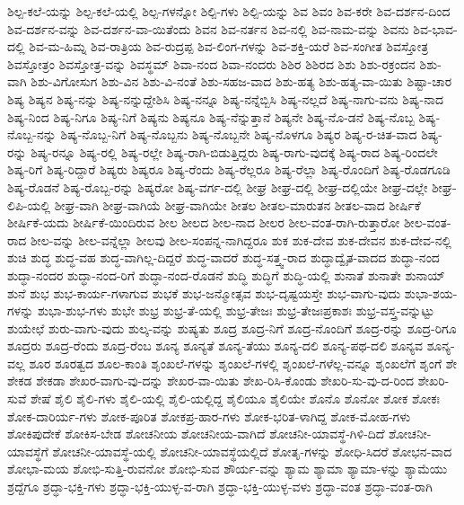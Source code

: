 {ಶಿಲ್ಪ-ಕಲೆ-ಯನ್ನು
ಶಿಲ್ಪ-ಕಲೆ-ಯಲ್ಲಿ
ಶಿಲ್ಪ-ಗಳನ್ನೋ
ಶಿಲ್ಪಿ-ಗಳು
ಶಿಲ್ಪಿ-ಯನ್ನು
ಶಿವ
ಶಿವಂ
ಶಿವ-ಕರೇ
ಶಿವ-ದರ್ಶನ-ದಿಂದ
ಶಿವ-ದರ್ಶನ-ವನ್ನು
ಶಿವ-ದರ್ಶನ-ವಾ-ಯಿತೆಂದು
ಶಿವನ
ಶಿವ-ನರ್ತನ
ಶಿವ-ನಲ್ಲಿ
ಶಿವ-ನಾಮ-ವನ್ನು
ಶಿವನು
ಶಿವ-ಭಾವ-ದಲ್ಲಿ
ಶಿವ-ಮ-ಹಿಮ್ನ
ಶಿವ-ರಾತ್ರಿಯ
ಶಿವ-ರುದ್ರಪ್ಪ
ಶಿವ-ಲಿಂಗ-ಗಳನ್ನು
ಶಿವ-ಶಕ್ತಿ-ಯರೆ
ಶಿವ-ಸಂಗೀತ
ಶಿವಸ್ತೋತ್ರ
ಶಿವಸ್ತೋತ್ರಂ
ಶಿವಸ್ತೋತ್ರ-ವನ್ನು
ಶಿವಸ್ಥಮ್
ಶಿವಾ-ನಂದ
ಶಿವಾ-ನಂದರು
ಶಿಶಿರ
ಶಿಶಿರದ
ಶಿಶು
ಶಿಶು-ರಕ್ರಂದನ
ಶಿಶು-ವಾಗಿ
ಶಿಶು-ವಿಗೋಸುಗ
ಶಿಶು-ವಿನ
ಶಿಶು-ವಿ-ನಂತೆ
ಶಿಶು-ಸಹಜ-ವಾದ
ಶಿಶು-ಹತ್ಯ
ಶಿಶು-ಹತ್ಯ-ವಾ-ಯಿತು
ಶಿಷ್ಟಾ-ಚಾರ
ಶಿಷ್ಯ
ಶಿಷ್ಯನ
ಶಿಷ್ಯ-ನನ್ನು
ಶಿಷ್ಯ-ನನ್ನುದ್ದೇಶಿಸಿ
ಶಿಷ್ಯ-ನನ್ನೂ
ಶಿಷ್ಯ-ನನ್ನೆಬ್ಬಿಸಿ
ಶಿಷ್ಯ-ನಲ್ಲದೆ
ಶಿಷ್ಯ-ನಾಗು-ವನು
ಶಿಷ್ಯ-ನಾದ
ಶಿಷ್ಯ-ನಿಂದ
ಶಿಷ್ಯ-ನಿಗೂ
ಶಿಷ್ಯ-ನಿಗೆ
ಶಿಷ್ಯನು
ಶಿಷ್ಯನೂ
ಶಿಷ್ಯ-ನೆನ್ನುತ್ತಾನೆ
ಶಿಷ್ಯನೇ
ಶಿಷ್ಯ-ನೊ-ಡನೆ
ಶಿಷ್ಯ-ನೊಬ್ಬ
ಶಿಷ್ಯ-ನೊಬ್ಬ-ನನ್ನು
ಶಿಷ್ಯ-ನೊಬ್ಬ-ನಿಗೆ
ಶಿಷ್ಯ-ನೊಬ್ಬನು
ಶಿಷ್ಯ-ನೊಬ್ಬನೇ
ಶಿಷ್ಯ-ನೊಳಗೂ
ಶಿಷ್ಯರ
ಶಿಷ್ಯ-ರ-ಚಿತ-ವಾದ
ಶಿಷ್ಯ-ರನ್ನು
ಶಿಷ್ಯ-ರನ್ನೂ
ಶಿಷ್ಯ-ರಲ್ಲಿ
ಶಿಷ್ಯ-ರಲ್ಲೇ
ಶಿಷ್ಯ-ರಾಗಿ-ಬಿಡುತ್ತಿದ್ದರು
ಶಿಷ್ಯ-ರಾಗು-ವುದಕ್ಕೆ
ಶಿಷ್ಯ-ರಾದ
ಶಿಷ್ಯ-ರಿಂದಲೇ
ಶಿಷ್ಯ-ರಿಗೆ
ಶಿಷ್ಯ-ರಿದ್ದಾರೆ
ಶಿಷ್ಯರು
ಶಿಷ್ಯರೂ
ಶಿಷ್ಯ-ರೆಂದು
ಶಿಷ್ಯ-ರೆಲ್ಲರೂ
ಶಿಷ್ಯ-ರೆಲ್ಲಾ
ಶಿಷ್ಯ-ರೊಂದಿಗೆ
ಶಿಷ್ಯ-ರೊಡಗೂಡಿ
ಶಿಷ್ಯ-ರೊಡನೆ
ಶಿಷ್ಯ-ರೊಬ್ಬ-ರನ್ನು
ಶಿಷ್ಯರೋ
ಶಿಷ್ಯ-ವರ್ಗ-ದಲ್ಲಿ
ಶೀಘ್ರ
ಶೀಘ್ರ-ದಲ್ಲಿ
ಶೀಘ್ರ-ದಲ್ಲಿಯೇ
ಶೀಘ್ರ-ದಲ್ಲೇ
ಶೀಘ್ರ-ಲಿಪಿ-ಯಲ್ಲಿ
ಶೀಘ್ರ-ವಾಗಿ
ಶೀಘ್ರ-ವಾಗಿಯೆ
ಶೀಘ್ರ-ವಾಗಿಯೇ
ಶೀತಲ
ಶೀತಲ-ಮಾರುತನ
ಶೀತಲ-ವಾದ
ಶೀರ್ಷಿಕೆ
ಶೀರ್ಷಿಕೆ-ಯದು
ಶೀರ್ಷಿಕೆ-ಯಿಂದಿರುವ
ಶೀಲ
ಶೀಲದ
ಶೀಲ-ನಾದ
ಶೀಲರ
ಶೀಲ-ವಂತ-ರಾಗಿ-ರುತ್ತಾರೋ
ಶೀಲ-ವಂತ-ರಾದ
ಶೀಲ-ವನ್ನು
ಶೀಲ-ವನ್ನೆಲ್ಲಾ
ಶೀಲವು
ಶೀಲ-ಸಂಪನ್ನ-ನಾಗಿದ್ದರೂ
ಶುಕ
ಶುಕ-ದೇವ
ಶುಕ-ದೇವನ
ಶುಕ-ದೇವ-ನಲ್ಲಿ
ಶುಚಿ
ಶುದ್ಧ
ಶುದ್ಧ-ವಹ
ಶುದ್ಧ-ವಾಗಿಲ್ಲ-ದಿದ್ದರೆ
ಶುದ್ಧ-ವಾದರೆ
ಶುದ್ಧ-ಸತ್ತ್ವ-ರಾದ
ಶುದ್ಧಾದ್ವೈತ-ವಾದದ
ಶುದ್ಧಾ-ನಂದ
ಶುದ್ಧಾ-ನಂದರ
ಶುದ್ಧಾ-ನಂದ-ರಿಗೆ
ಶುದ್ಧಾ-ನಂದ-ರೊಡನೆ
ಶುದ್ಧಿ
ಶುದ್ಧಿಗೆ
ಶುದ್ಧಿ-ಯಲ್ಲಿ
ಶುನಾತೆ
ಶುನಾತೇ
ಶುನಾಯ್
ಶುನೆ
ಶುಭ
ಶುಭ-ಕಾರ್ಯ-ಗಳಾಗುವ
ಶುಭಕೆ
ಶುಭ-ಜನ್ಮೋತ್ಸವ
ಶುಭ-ದೃಷ್ಟಯಸ್ತೇ
ಶುಭ-ವಾಗು-ವುದು
ಶುಭಾ-ಶಯ-ಗಳನ್ನು
ಶುಭಾ-ಶುಭ-ಗಳು
ಶುಭೇ
ಶುಭ್ರ
ಶುಭ್ರ-ತೆ-ಯಲ್ಲಿ
ಶುಭ್ರ-ತೇಜಃ
ಶುಭ್ರ-ತೇಜಃಪ್ರಕಾಶಃ
ಶುಭ್ರ-ವಸ್ತ್ರ-ವನ್ನುಟ್ಟು
ಶುಯೇಛೆ
ಶುರು-ವಾಗು-ವುದು
ಶುಲ್ಕ-ವನ್ನು
ಶುಷ್ಯತು
ಶೂದ್ರ
ಶೂದ್ರ-ನಿಗೆ
ಶೂದ್ರ-ನೊಂದಿಗೆ
ಶೂದ್ರ-ರನ್ನು
ಶೂದ್ರ-ರಿಗೂ
ಶೂದ್ರರು
ಶೂದ್ರ-ರೆಂದು
ಶೂದ್ರ-ರೆಂಬ
ಶೂನ್ಯ
ಶೂನ್ಯತೆ
ಶೂನ್ಯ-ತೆಯು
ಶೂನ್ಯ-ದಲಿ
ಶೂನ್ಯ-ಪಥ-ದಲಿ
ಶೂನ್ಯವ
ಶೂನ್ಯ-ವಲ್ಲ
ಶೂರ
ಶೂರತ್ವದ
ಶೂಲ-ಕಾಂತಿ
ಶೃಂಖಲೆ-ಗಳನ್ನು
ಶೃಂಖಲೆ-ಗಳಲ್ಲಿ
ಶೃಂಖಲೆ-ಗಳೆಲ್ಲ-ವನ್ನೂ
ಶೃಂಖಲೆಗೆ
ಶೃಂಗೆ
ಶೇ
ಶೇಕಡ
ಶೇಕಡಾ
ಶೇಖರ-ವಾಗು-ವು-ದನ್ನು
ಶೇಖರ-ವಾ-ಯಿತು
ಶೇಖ-ರಿಸಿ-ಕೊಂಡು
ಶೇಖರಿ-ಸು-ವು-ದ-ರಿಂದ
ಶೇಖರಿ-ಸುವೆ
ಶೇಷೆ
ಶೈಲಿ
ಶೈಲಿ-ಗಳು
ಶೈಲಿ-ಯಲ್ಲಿ
ಶೈಲಿ-ಯಲ್ಲಿದ್ದ
ಶೈಲಿಯೂ
ಶೈಲಿಯೇ
ಶೊನೊ
ಶೊನೋ
ಶೋಕ
ಶೋಕಃ
ಶೋಕ-ದಾರಿರ್ಯ-ಗಳು
ಶೋಕ-ಪೂರಿತ
ಶೋಕಪ್ರ-ಹಾರ-ಗಳು
ಶೋಕ-ಭರಿತ-ಳಾಗಿದ್ದ
ಶೋಕ-ಮೋಹ-ಗಳು
ಶೋಕಿಪುದೇಕೆ
ಶೋಕಿಸ-ಬೇಡ
ಶೋಚನೀಯ
ಶೋಚನೀಯ-ವಾಗಿದೆ
ಶೋಚನೀ-ಯಾವಸ್ಥೆ-ಗಿಳಿ-ದಿದೆ
ಶೋಚನೀ-ಯಾವಸ್ಥೆಗೆ
ಶೋಚನೀ-ಯಾವಸ್ಥೆ-ಯಲ್ಲಿ
ಶೋಚನೀ-ಯಾವಸ್ಥೆಯಲ್ಲಿದೆ
ಶೋತೃ-ಗಳನ್ನು
ಶೋಧಿ-ಸಿದರೆ
ಶೋಭನ-ವಾದ
ಶೋಭಾ-ಮಯ
ಶೋಭಿ-ಸುತ್ತಿ-ರುವನೋ
ಶೋಭಿ-ಸುವ
ಶೌರ್ಯ-ವನ್ನು
ಶ್ಯಾಮ
ಶ್ಯಾಮಾ
ಶ್ಯಾಮಾ-ಳನ್ನು
ಶ್ಯಾಮೆಯು
ಶ್ರದ್ದೆಗೂ
ಶ್ರದ್ಧಾ-ಭಕ್ತಿ-ಗಳು
ಶ್ರದ್ಧಾ-ಭಕ್ತಿ-ಯುಳ್ಳ-ವ-ರಾಗಿ
ಶ್ರದ್ಧಾ-ಭಕ್ತಿ-ಯುಳ್ಳ-ವಳು
ಶ್ರದ್ಧಾ-ವಂತ
ಶ್ರದ್ಧಾ-ವಂತ-ರಾಗಿ
}
